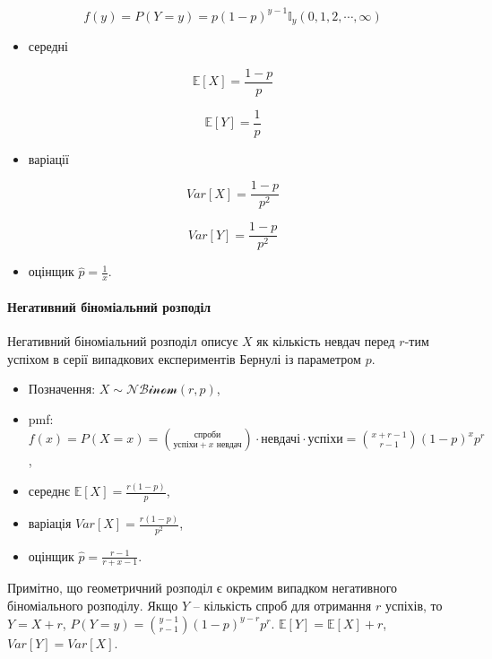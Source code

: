 \documentclass[
  11pt,
]{book}
\providecommand{\tightlist}{%
  \setlength{\itemsep}{0pt}\setlength{\parskip}{0pt}}
\begin{document}
\[f(y) = P(Y = y) = p(1-p)^{y-1} \mathbb{I}_y (0, 1, 2, \cdots, \infty)\]

\begin{itemize}
\tightlist
\item
  середні
\end{itemize}

\[\mathbb{E} [X] = \frac{1-p}{p}\]

\[\mathbb{E} [Y] = \frac{1}{p}\]

\begin{itemize}
\tightlist
\item
  варіації
\end{itemize}

\[Var[X] = \frac{1-p}{p^2}\]

\[Var[Y] = \frac{1-p}{p^2}\]

\begin{itemize}
\tightlist
\item
  оцінщик \(\hat{p} = \frac{1}{x}\).
\end{itemize}

\paragraph{Негативний біноміальний
розподіл}\label{ux43dux435ux433ux430ux442ux438ux432ux43dux438ux439-ux431ux456ux43dux43eux43cux456ux430ux43bux44cux43dux438ux439-ux440ux43eux437ux43fux43eux434ux456ux43b}

Негативний біноміальний розподіл описує \(X\) як кількість невдач перед
\(r\)-тим успіхом в серії випадкових експериментів Бернулі із параметром
\(p\).

\begin{itemize}
\item
  Позначення: \(X \sim \mathcal{NBinom} (r, p)\),
\item
  pmf:
  \(f(x) = P(X = x) = \binom{\text{спроби}}{\text{успіхи} + x \text{ невдач}} \cdot \text{невдачі} \cdot \text{успіхи} = \binom{x + r - 1}{r-1} (1-p) ^x p^r\),
\item
  середнє \(\mathbb{E} [X] = \frac{r(1-p)}{p}\),
\item
  варіація \(Var[X] = \frac{r(1-p)}{p^2}\),
\item
  оцінщик \(\hat{p} = \frac{r-1}{r + x - 1}\).
\end{itemize}

Примітно, що геометричний розподіл є окремим випадком негативного
біноміального розподілу. Якщо \(Y\) -- кількість спроб для отримання
\(r\) успіхів, то \(Y = X + r\),
\(P(Y = y) = \binom{y-1}{r-1} (1-p)^{y-r} p^r\).
\(\mathbb{E}[Y] = \mathbb{E}[X] + r\), \(Var[Y] = Var[X]\).
\end{document}
